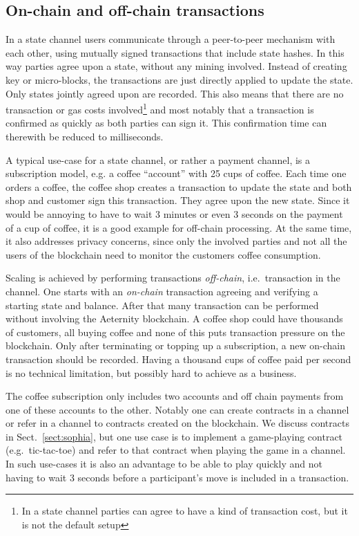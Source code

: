 \subsection{On-chain and off-chain transactions}

In a state channel users communicate through a peer-to-peer mechanism with
each other, using mutually signed transactions that include state
hashes. In this way parties agree upon a state, without any
mining involved. Instead of creating key or micro-blocks, the transactions are just
directly applied to update the state. Only states
jointly agreed upon are recorded. This also
means that there are no transaction or gas costs involved\footnote{In a state
channel parties can agree to have a kind of transaction cost, but it
is not the default setup} and most notably that a transaction
is confirmed as quickly as both parties can sign it. This confirmation
time can therewith be reduced to milliseconds.

A typical use-case for a state channel, or rather a payment channel, is a
subscription model, e.g. a coffee ``account'' with 25 cups of coffee.
Each time one orders a coffee, the coffee shop
creates a transaction to update the state and both shop
and customer sign this transaction. They agree upon the new state.
Since it would be annoying to have to wait 3 minutes or even 3 seconds
on the payment of a cup of coffee, it is a good example for off-chain
processing. At the same time, it also addresses privacy concerns,
since only the involved parties and not all the users of the
blockchain need to monitor the customers coffee consumption.

Scaling is achieved by performing transactions \textit{off-chain},
i.e.\ transaction in the channel. One starts with an \textit{on-chain}
transaction agreeing and verifying a starting state and balance. After
that many transaction can be performed without involving the Aeternity
blockchain. A coffee shop could have thousands of customers, all buying coffee and none of
this puts transaction pressure on the blockchain. Only after
terminating or topping up a subscription, a new on-chain
transaction should be recorded. Having a thousand cups of coffee paid
per second is no technical limitation, but possibly hard to achieve as
a business.

The coffee subscription only includes two accounts and off chain
payments from one of these accounts to the other.
Notably one
can create contracts in a channel or refer in a channel to contracts
created on the blockchain. We discuss contracts in Sect.\
\ref{sect:sophia}, but one use case is to implement a game-playing
contract (e.g.\ tic-tac-toe) and refer to that contract when playing the
game in a channel. In such use-cases it is also an advantage to be
able to play quickly and not having to wait 3 seconds before a participant's move
is included in a transaction.

